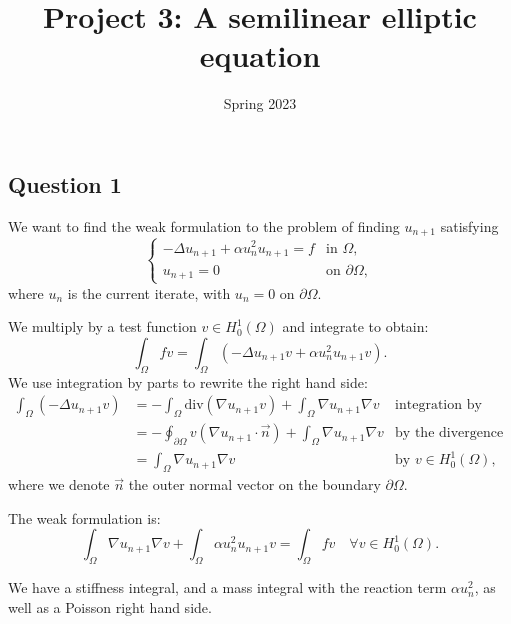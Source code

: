 \documentclass[11pt, a4paper, twoside]{article}
\newcommand{\grad}{\nabla} %
\renewcommand{\div}{\text{div}} %
\newcommand{\Hunz}{H^1_0(\Omega)}
\newcommand{\intom}{\int_\Omega}
\newcommand{\intbd}{\oint_{\partial \Omega}}
\begin{document}
\title{Project 3: A semilinear elliptic equation}
\author{}
\date{Spring 2023}
\maketitle 

\subsection*{Question 1}
We want to find the weak formulation to the problem of finding $u_{n+1}$ satisfying
$$\begin{cases}  - \Delta u_{n+1} + \alpha u_n^2 u_{n+1} = f & \text{in } \Omega,\\
u_{n+1} = 0 &\text{on } \partial\Omega,
\end{cases}$$
where $u_n$ is the current iterate, with $u_n = 0$ on $\partial\Omega$.\newline

We multiply by a test function $v\in \Hunz$ and integrate to obtain:
$$\intom fv = \intom \left( -\Delta u_{n+1} v + \alpha u_n^2 u_{n+1} v \right).$$
We use integration by parts to rewrite the right hand side:
\begin{align*}
 \intom (-\Delta u_{n+1} v)
 &= - \intom \div(\grad u_{n+1} v) + \intom \grad u_{n+1} \grad v
 	&\text{integration by part}
 \\%
 &= - \intbd v (\grad u_{n+1} \cdot \vec n) + \intom \grad u_{n+1} \grad v
 	&\text{by the divergence theorem}
 \\%
 &=  \intom \grad u_{n+1} \grad v
 	&\text{by } v\in\Hunz,
\end{align*}
where we denote $\vec n$ the outer normal vector on the boundary $\partial \Omega$.

The weak formulation is:
\begin{equation}
\label{weak_f} \tag{E1}
\intom
\grad u_{n+1} \grad v
+ 
\intom
\alpha u_n^2 u_{n+1} v
= \intom fv
\quad \forall v\in\Hunz.
\end{equation}

We have a stiffness integral, and a mass integral with the reaction term $\alpha u_n^2$, as well as a Poisson right hand side.

\end{document}
